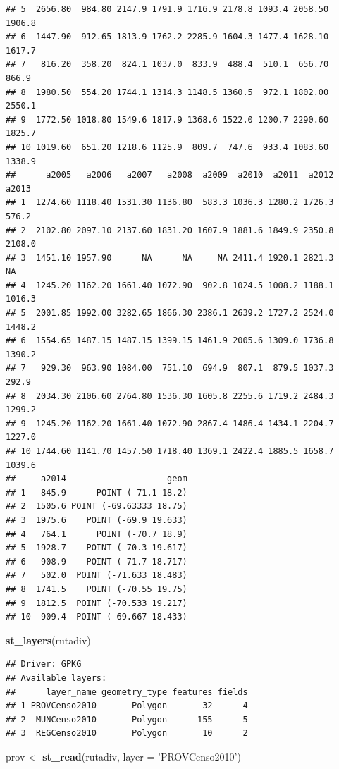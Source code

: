 \documentclass[11pt,]{article}
\newenvironment{Shaded}{\begin{snugshade}}{\end{snugshade}}
\newcommand{\KeywordTok}[1]{\textcolor[rgb]{0.13,0.29,0.53}{\textbf{#1}}}
\newcommand{\DataTypeTok}[1]{\textcolor[rgb]{0.13,0.29,0.53}{#1}}
\newcommand{\StringTok}[1]{\textcolor[rgb]{0.31,0.60,0.02}{#1}}
\newcommand{\NormalTok}[1]{#1}
\begin{document}
\begin{verbatim}
## 5  2656.80  984.80 2147.9 1791.9 1716.9 2178.8 1093.4 2058.50 1906.8
## 6  1447.90  912.65 1813.9 1762.2 2285.9 1604.3 1477.4 1628.10 1617.7
## 7   816.20  358.20  824.1 1037.0  833.9  488.4  510.1  656.70  866.9
## 8  1980.50  554.20 1744.1 1314.3 1148.5 1360.5  972.1 1802.00 2550.1
## 9  1772.50 1018.80 1549.6 1817.9 1368.6 1522.0 1200.7 2290.60 1825.7
## 10 1019.60  651.20 1218.6 1125.9  809.7  747.6  933.4 1083.60 1338.9
##      a2005   a2006   a2007   a2008  a2009  a2010  a2011  a2012  a2013
## 1  1274.60 1118.40 1531.30 1136.80  583.3 1036.3 1280.2 1726.3  576.2
## 2  2102.80 2097.10 2137.60 1831.20 1607.9 1881.6 1849.9 2350.8 2108.0
## 3  1451.10 1957.90      NA      NA     NA 2411.4 1920.1 2821.3     NA
## 4  1245.20 1162.20 1661.40 1072.90  902.8 1024.5 1008.2 1188.1 1016.3
## 5  2001.85 1992.00 3282.65 1866.30 2386.1 2639.2 1727.2 2524.0 1448.2
## 6  1554.65 1487.15 1487.15 1399.15 1461.9 2005.6 1309.0 1736.8 1390.2
## 7   929.30  963.90 1084.00  751.10  694.9  807.1  879.5 1037.3  292.9
## 8  2034.30 2106.60 2764.80 1536.30 1605.8 2255.6 1719.2 2484.3 1299.2
## 9  1245.20 1162.20 1661.40 1072.90 2867.4 1486.4 1434.1 2204.7 1227.0
## 10 1744.60 1141.70 1457.50 1718.40 1369.1 2422.4 1885.5 1658.7 1039.6
##     a2014                    geom
## 1   845.9      POINT (-71.1 18.2)
## 2  1505.6 POINT (-69.63333 18.75)
## 3  1975.6    POINT (-69.9 19.633)
## 4   764.1      POINT (-70.7 18.9)
## 5  1928.7    POINT (-70.3 19.617)
## 6   908.9    POINT (-71.7 18.717)
## 7   502.0  POINT (-71.633 18.483)
## 8  1741.5    POINT (-70.55 19.75)
## 9  1812.5  POINT (-70.533 19.217)
## 10  909.4  POINT (-69.667 18.433)
\end{verbatim}

\begin{Shaded}
\begin{Highlighting}[]
\KeywordTok{st_layers}\NormalTok{(rutadiv)}
\end{Highlighting}
\end{Shaded}

\begin{verbatim}
## Driver: GPKG 
## Available layers:
##      layer_name geometry_type features fields
## 1 PROVCenso2010       Polygon       32      4
## 2  MUNCenso2010       Polygon      155      5
## 3  REGCenso2010       Polygon       10      2
\end{verbatim}

\begin{Shaded}
\begin{Highlighting}[]
\NormalTok{prov <-}\StringTok{ }\KeywordTok{st_read}\NormalTok{(rutadiv, }\DataTypeTok{layer =} \StringTok{'PROVCenso2010'}\NormalTok{)}
\end{Highlighting}
\end{Shaded}
\end{document}
